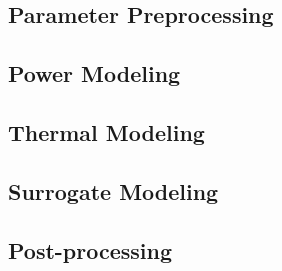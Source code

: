 \subsection{Parameter Preprocessing} 


\subsection{Power Modeling} 


\subsection{Thermal Modeling} 


\subsection{Surrogate Modeling} 


\vspace{-1em}
\subsection{Post-processing} 

